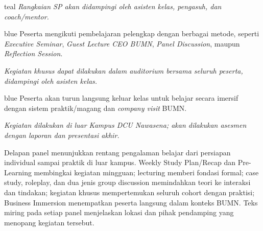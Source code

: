 \begin{tcbraster}[raster columns=4,raster equal height=rows,raster column skip=2mm,raster row skip=2mm]
\begin{infobox}{teal}
\textit{Rangkaian SP akan didampingi oleh asisten kelas, pengasuh, dan coach/mentor.}
\end{infobox}
\begin{infobox}{blue}
Peserta mengikuti pembelajaran pelengkap dengan berbagai metode, seperti \textit{Executive Seminar}, \textit{Guest Lecture CEO BUMN}, \textit{Panel Discussion}, maupun \textit{Reflection Session}.

\textit{Kegiatan khusus dapat dilakukan dalam auditorium bersama seluruh peserta, didampingi oleh asisten kelas.}
\end{infobox}
\begin{infobox}{blue}
Peserta akan turun langsung keluar kelas untuk belajar secara imersif dengan sistem praktik/magang dan \textit{company visit} BUMN.

\textit{Kegiatan dilakukan di luar Kampus DCU Nawasena; akan dilakukan asesmen dengan laporan dan presentasi akhir.}
\end{infobox}
\end{tcbraster}

\begin{visualexplanation}
Delapan panel menunjukkan rentang pengalaman belajar dari persiapan individual sampai praktik di luar kampus. Weekly Study Plan/Recap dan Pre-Learning membingkai kegiatan mingguan; lecturing memberi fondasi formal; case study, roleplay, dan dua jenis group discussion memindahkan teori ke interaksi dan tindakan; kegiatan khusus mempertemukan seluruh cohort dengan praktisi; Business Immersion menempatkan peserta langsung dalam konteks BUMN. Teks miring pada setiap panel menjelaskan lokasi dan pihak pendamping yang menopang kegiatan tersebut.
\end{visualexplanation}

